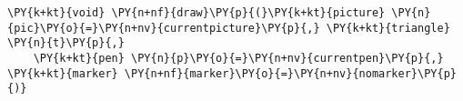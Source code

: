 \begin{Verbatim}[commandchars=\\\{\}]
    \PY{k+kt}{void} \PY{n+nf}{draw}\PY{p}{(}\PY{k+kt}{picture} \PY{n}{pic}\PY{o}{=}\PY{n+nv}{currentpicture}\PY{p}{,} \PY{k+kt}{triangle} \PY{n}{t}\PY{p}{,}
    \PY{k+kt}{pen} \PY{n}{p}\PY{o}{=}\PY{n+nv}{currentpen}\PY{p}{,} \PY{k+kt}{marker} \PY{n+nf}{marker}\PY{o}{=}\PY{n+nv}{nomarker}\PY{p}{)}
\end{Verbatim}
